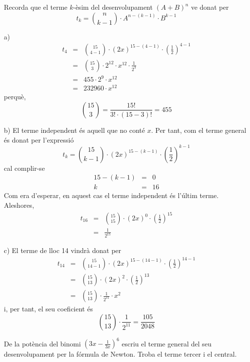\begin{solucio}
Recorda que el terme $k$-èsim del desenvolupament $(A+B)^{n}$ ve
donat per\[
t_{k}=\binom{n}{k-1}\cdot A^{n-(k-1)}\cdot B^{k-1}
\]

a)
\begin{eqnarray*}
t_{4} &=&\binom{15}{4-1}\cdot \left( 2x\right) ^{15-(4-1)}\cdot \left( \frac{1}{2}\right) ^{4-1} \\
&=&\binom{15}{3}\cdot 2^{12}\cdot x^{12}\cdot \frac{1}{2^{3}} \\
&=&455\cdot 2^{9}\cdot x^{12} \\
&=&232960\cdot x^{12}
\end{eqnarray*}perquè,\[
\binom{15}{3}=\frac{15!}{3!\cdot (15-3)!}=455
\]

b) El terme independent és aquell que no conté $x$. Per tant,
com el terme general és donat per l'expressió\[
t_{k}=\binom{15}{k-1}\cdot \left( 2x\right) ^{15-(k-1)}\cdot \left( \frac{1}{2}\right) ^{k-1}
\]cal complir-se\begin{eqnarray*}
15-(k-1) &=&0 \\
k &=&16
\end{eqnarray*}Com era d'esperar, en aquest cas el terme independent és l'últim
terme. Aleshores,\begin{eqnarray*}
t_{16} &=&\binom{15}{15}\cdot \left( 2x\right) ^{0}\cdot \left( \frac{1}{2}\right) ^{15} \\
&=&\frac{1}{2^{15}}
\end{eqnarray*}

c) El terme de lloc 14 vindrà donat per\begin{eqnarray*}
t_{14} &=&\binom{15}{14-1}\cdot \left( 2x\right) ^{15-(14-1)}\cdot \left(
\frac{1}{2}\right) ^{14-1} \\
&=&\binom{15}{13}\cdot \left( 2x\right) ^{2}\cdot \left( \frac{1}{2}\right)
^{13} \\
&=&\binom{15}{13}\cdot \frac{1}{2^{11}}\cdot x^{2}
\end{eqnarray*}i, per tant, el seu coeficient és\[
\binom{15}{13}\cdot \frac{1}{2^{11}}=\frac{105}{2048}
\]
\end{solucio}

\begin{exercici}
De la potència del binomi $\left( 3x-\frac{1}{3x}\right) ^{6}$ escriu el terme general del seu desenvolupament per la fórmula de Newton. Troba el terme tercer i el central.
\end{exercici}

